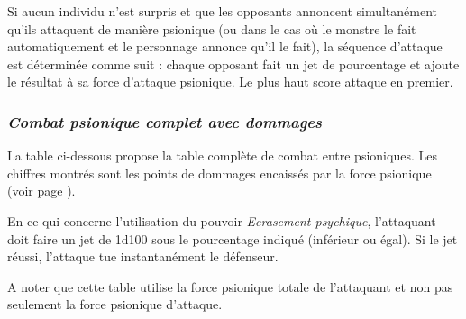 \bigskip

Si aucun individu n'est surpris et que les opposants annoncent simultanément qu'ils attaquent de manière psionique (ou dans le cas où le monstre le fait automatiquement et le personnage annonce qu'il le fait), la séquence d'attaque est déterminée comme suit : chaque opposant fait un jet de pourcentage et ajoute le résultat à sa force d'attaque psionique. Le plus haut score attaque en premier.

\subsubsection*{\textit{Combat psionique complet avec dommages}}
\label{custom-combat}

La table ci-dessous propose la table complète de combat entre psioniques. Les chiffres montrés sont les points de dommages encaissés par la force psionique (voir page \pageref{custom-utilisation-pouvoirs}).

\bigskip

En ce qui concerne l'utilisation du pouvoir \textit{Ecrasement psychique}, l'attaquant doit faire un jet de 1d100 sous le pourcentage indiqué (inférieur ou égal). Si le jet réussi, l'attaque tue instantanément le défenseur.

\bigskip

A noter que cette table utilise la force psionique totale de l'attaquant et non pas seulement la force psionique d'attaque.

\bigskip

